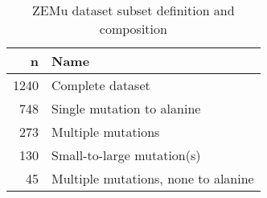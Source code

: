 \begin{table}
  \begin{tabular}{rl}
\toprule
    n &                                 Name \\
\midrule
 1240 &                     Complete dataset \\
  748 &           Single mutation to alanine \\
  273 &                   Multiple mutations \\
  130 &           Small-to-large mutation(s) \\
   45 &  Multiple mutations, none to alanine \\
\bottomrule
\end{tabular}

  \caption[]{ZEMu dataset subset definition and composition} \label{tab:table-composition}
\end{table}
